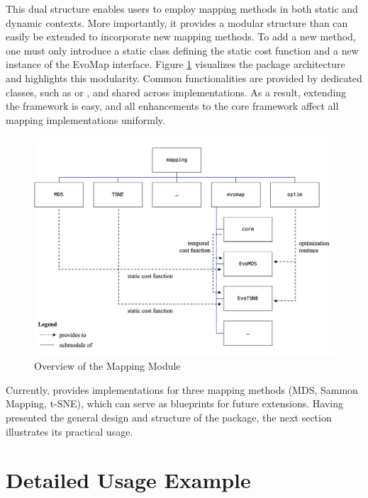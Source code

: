 \documentclass[article]{jss}
\begin{document}
This dual structure enables users to employ mapping methods in both static and dynamic contexts. More importantly, 
it provides a modular structure than can easily be extended to incorporate new mapping methods. To add a new method, 
one must only introduce a static class defining the static cost function and a new instance of the 
EvoMap  interface. Figure \ref{fig:package-design} visualizes the package architecture and highlights this 
modularity. Common functionalities are provided by dedicated classes, such as  or , and 
shared across implementations. As a result, extending the framework is easy, and all enhancements to the core 
framework affect all mapping implementations uniformly.

\begin{figure}[hbt!]
  \centering
  \includegraphics{../misc/package-design.png}
  \caption{\label{fig:package-design} Overview of the Mapping Module}
\end{figure}
  
Currently,  provides implementations for three mapping methods (MDS, Sammon
Mapping, t-SNE), which can serve as blueprints for future extensions. Having presented the
general design and structure of the package, the next section illustrates its practical usage. 


\section{Detailed Usage Example} \label{sec:usage-example}
\end{document}
